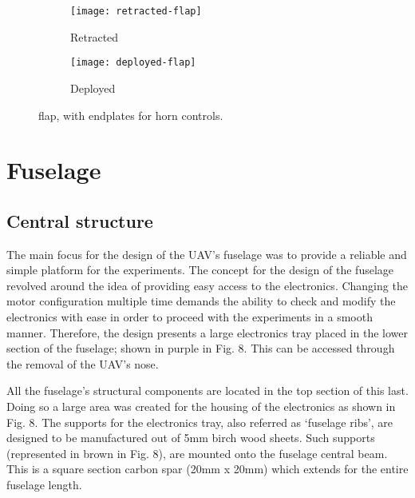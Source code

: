 \documentclass[../../main.tex]{subfiles}
\begin{document}

\begin{figure}[H]

    \centering
    \begin{subfigure}[b]{0.49\columnwidth}
        \centering
        \texttt{[image: retracted-flap]}
        \caption{Retracted}
        \label{fig:flaps:retracted}
    \end{subfigure}
    \hfill
    \begin{subfigure}[b]{0.49\columnwidth}
        \centering
        \texttt{[image: deployed-flap]}
        \caption{Deployed}
        \label{fig:flaps:deployed}
    \end{subfigure}
    
    \caption{flap, with endplates for horn controls.}
    \label{fig:flaps}
\end{figure}

\section{Fuselage} \label{sec:final-design-proposal:fuselage}

\subsection{Central structure} \label{sec:final-design-proposal:fuselage:central-structure}

The main focus for the design of the UAV’s fuselage was to provide a reliable and simple platform for the experiments.
The concept for the design of the fuselage revolved around the idea of providing easy access to the electronics.
Changing the motor configuration multiple time demands the ability to check and modify the electronics with ease in order to proceed with the experiments in a smooth manner.
Therefore, the design presents a large electronics tray placed in the lower section of the fuselage; shown in purple in Fig. 8.
This can be accessed through the removal of the UAV’s nose.


All the fuselage’s structural components are located in the top section of this last.
Doing so a large area was created for the housing of the electronics as shown in Fig. 8.
The supports for the electronics tray, also referred as ‘fuselage ribs’, are designed to be manufactured out of 5mm birch wood sheets.
Such supports (represented in brown in Fig. 8), are mounted onto the fuselage central beam.
This is a square section carbon spar (20mm x 20mm) which extends for the entire fuselage length. 
\end{document}
